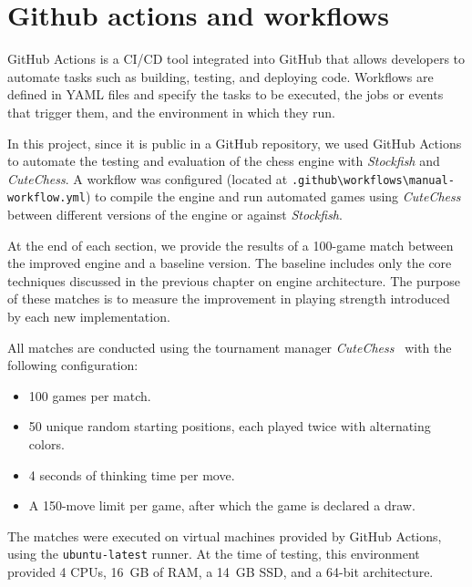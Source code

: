 \vspace{1em}

\section{Github actions and workflows}

GitHub Actions is a CI/CD tool integrated into GitHub that allows developers to automate tasks such as building, testing, and deploying code. Workflows are defined in YAML files and specify the tasks to be executed, the jobs or events that trigger them, and the environment in which they run.

\vspace{1em}

\noindent In this project, since it is public in a GitHub repository, we used GitHub Actions to automate the testing and evaluation of the chess engine with \textit{Stockfish} and \textit{CuteChess}. A workflow was configured (located at \texttt{.github\textbackslash{}workflows\textbackslash{}manual-workflow.yml}) to compile the engine and run automated games using \textit{CuteChess} between different versions of the engine or against \textit{Stockfish}.

\vspace{1em}

\noindent At the end of each section, we provide the results of a 100-game match between the improved engine and a baseline version. The baseline includes only the core techniques discussed in the previous chapter on engine architecture. The purpose of these matches is to measure the improvement in playing strength introduced by each new implementation.

\vspace{1em}

\noindent All matches are conducted using the tournament manager \textit{CuteChess}~\cite{CuteChess} with the following configuration:

\begin{itemize}[itemsep=1pt]
\item 100 games per match.
\item 50 unique random starting positions, each played twice with alternating colors.
\item 4 seconds of thinking time per move.
\item A 150-move limit per game, after which the game is declared a draw.
\end{itemize}

\noindent The matches were executed on virtual machines provided by GitHub Actions, using the \texttt{ubuntu-latest} runner. At the time of testing, this environment provided 4 CPUs, 16~GB of RAM, a 14~GB SSD, and a 64-bit architecture.

